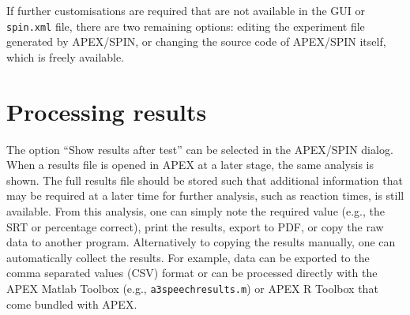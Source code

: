 If further customisations are required that are not available in the GUI
or \texttt{spin.xml} file, there are two remaining options: editing the
experiment file generated by APEX/SPIN, or changing the source code of
APEX/SPIN itself, which is freely available.


\section{Processing results}\label{processing-results}

The option ``Show results after test'' can be selected in the APEX/SPIN dialog. When a results file is opened in APEX at a later stage,
the same analysis is shown. The full results file should be stored
such that additional information that may be required at a
later time for further analysis, such as reaction times, is still available. From this analysis,
one can simply note the required value (e.g., the SRT or percentage
correct), print the results, export to PDF, or copy the raw data to
another program.  Alternatively to copying the results manually, one can
automatically collect the results. For example, data can be exported to the comma separated values (CSV) format
 or can be processed directly with the APEX Matlab Toolbox (e.g., \texttt{a3speechresults.m}) or APEX R Toolbox that come bundled with APEX.
